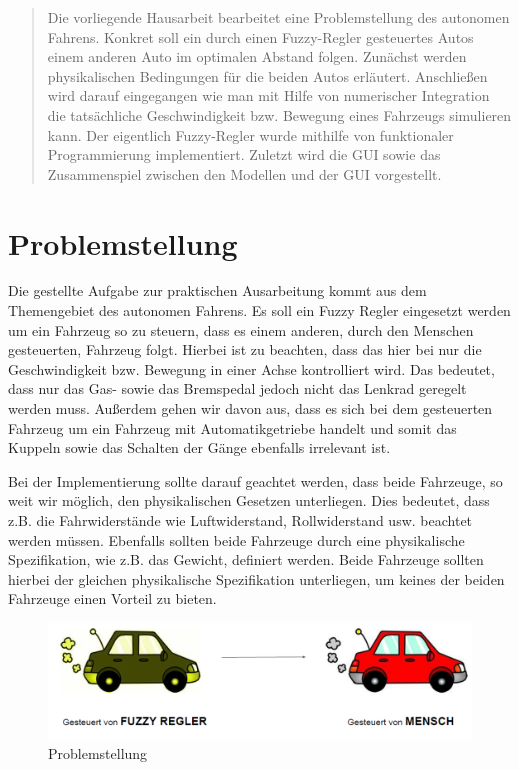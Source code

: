 \documentclass[12pt,a4paper,bibliography=totocnumbered,listof=totocnumbered, abstracton]{scrartcl}
\theoremstyle{Umgebung}
\begin{document}
\begin{abstract} 
	Die vorliegende Hausarbeit bearbeitet eine Problemstellung des autonomen Fahrens. Konkret soll ein durch einen Fuzzy-Regler gesteuertes Autos einem anderen Auto im optimalen Abstand folgen. Zunächst werden physikalischen Bedingungen für die beiden Autos erläutert. Anschließen wird darauf eingegangen wie man mit Hilfe von numerischer Integration die tatsächliche Geschwindigkeit bzw. Bewegung eines Fahrzeugs simulieren kann. Der eigentlich Fuzzy-Regler wurde mithilfe von funktionaler Programmierung implementiert. Zuletzt wird die GUI sowie das Zusammenspiel zwischen den Modellen und der GUI vorgestellt.

\end{abstract} 
\newpage

\section{Problemstellung}

Die gestellte Aufgabe zur praktischen Ausarbeitung kommt aus dem Themengebiet des autonomen Fahrens. Es soll ein Fuzzy Regler eingesetzt werden um ein Fahrzeug so zu steuern, dass es einem anderen, durch den Menschen gesteuerten, Fahrzeug folgt.  Hierbei ist zu beachten, dass das hier bei nur die Geschwindigkeit bzw. Bewegung in einer Achse kontrolliert wird. Das bedeutet, dass nur das Gas- sowie das Bremspedal jedoch nicht das Lenkrad geregelt werden muss. Außerdem gehen wir davon aus, dass es sich bei dem gesteuerten Fahrzeug um ein Fahrzeug mit Automatikgetriebe handelt und somit das Kuppeln sowie das Schalten der Gänge ebenfalls irrelevant ist. 

Bei der Implementierung sollte darauf geachtet werden, dass beide Fahrzeuge, so weit wir möglich, den physikalischen Gesetzen unterliegen. Dies bedeutet, dass z.B. die Fahrwiderstände wie Luftwiderstand, Rollwiderstand usw. beachtet werden müssen. Ebenfalls sollten beide Fahrzeuge durch eine physikalische Spezifikation, wie z.B. das Gewicht, definiert werden. Beide Fahrzeuge sollten hierbei der gleichen physikalische Spezifikation unterliegen, um keines der beiden Fahrzeuge einen Vorteil zu bieten.

\begin{figure}
	\centering
	\includegraphics[width=0.9\linewidth]{img/practical/problem}
	\caption{Problemstellung}
	\label{fig:problem}
\end{figure}
\end{document}
